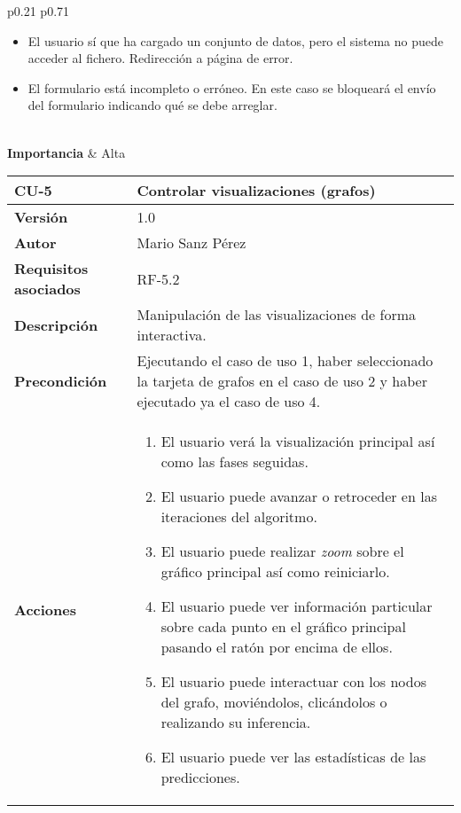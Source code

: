 \begin{table}[p]
\begin{tabularx}{\linewidth}{ p{0.21\columnwidth} p{0.71\columnwidth} }
\begin{itemize}
			\item El usuario sí que ha cargado un conjunto de datos, pero el sistema no puede acceder al fichero. Redirección a página de error.
			\item El formulario está incompleto o erróneo. En este caso se bloqueará el envío del formulario indicando qué se debe arreglar.
		\end{itemize} \\
		\textbf{Importancia}          & Alta \\
		\bottomrule
	\end{tabularx}
	\caption[CU-04: Configurar un algoritmo]{Caso de uso 4: Configurar algoritmo.}
\end{table}

\begin{table}[p]
	\centering
	\begin{tabularx}{\linewidth}{ p{} p{} }
		\toprule
		\textbf{CU-5}    & \textbf{Controlar visualizaciones (grafos)}\\
		\toprule
		\textbf{Versión}              & 1.0    \\
		\textbf{Autor}                & Mario Sanz Pérez \\
		\textbf{Requisitos asociados} & RF-5.2 \\
		\textbf{Descripción}          & Manipulación de las visualizaciones de forma interactiva. \\
		\textbf{Precondición}         & Ejecutando el caso de uso 1, haber seleccionado la tarjeta de grafos en el caso de uso 2 y haber ejecutado ya el caso de uso 4. \\
		\textbf{Acciones}             &
		\begin{enumerate}
			\def\labelenumi{\arabic{enumi}.}
			\tightlist
			\item El usuario verá la visualización principal así como las fases seguidas.
			\item El usuario puede avanzar o retroceder en las iteraciones del algoritmo.
			\item El usuario puede realizar \textit{zoom} sobre el gráfico principal así como reiniciarlo.
			\item El usuario puede ver información particular sobre cada punto en el gráfico principal pasando el ratón por encima de ellos.
			\item El usuario puede interactuar con los nodos del grafo, moviéndolos, clicándolos o realizando su inferencia.
			\item El usuario puede ver las estadísticas de las predicciones.

\end{enumerate}
\end{tabularx}
\end{table}
